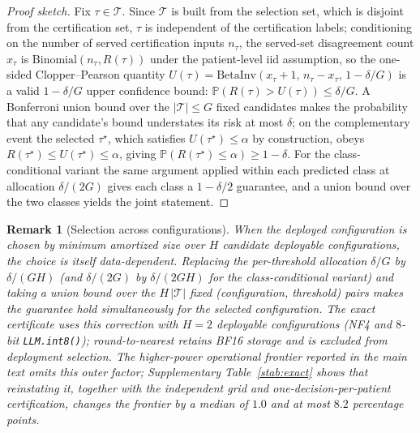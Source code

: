 \documentclass[11pt]{article}
\newtheorem*{remark}{Remark}
\theoremstyle{plain}
\newcommand{\Prob}{\mathbb{P}}
\newcommand{\Risk}{R}
\begin{document}
\begin{proof}[Proof sketch]
Fix $\tau\in\mathcal{T}$. Since $\mathcal{T}$ is built from the selection set, which is disjoint from the
certification set, $\tau$ is independent of the certification labels; conditioning on the number of
served certification inputs $n_\tau$, the served-set disagreement count $x_\tau$ is
$\mathrm{Binomial}(n_\tau,\Risk(\tau))$ under the patient-level iid assumption, so the one-sided Clopper--Pearson quantity
$U(\tau)=\mathrm{BetaInv}(x_\tau+1,\,n_\tau-x_\tau,\,1-\delta/G)$ is a valid $1-\delta/G$ upper confidence
bound: $\Prob(\Risk(\tau)>U(\tau))\le\delta/G$. A Bonferroni union bound over the $|\mathcal{T}|\le G$
fixed candidates makes the probability that any candidate's bound understates its risk at most $\delta$;
on the complementary event the selected $\tau^\star$, which satisfies $U(\tau^\star)\le\alpha$ by
construction, obeys $\Risk(\tau^\star)\le U(\tau^\star)\le\alpha$, giving
$\Prob(\Risk(\tau^\star)\le\alpha)\ge 1-\delta$. For the class-conditional variant the same argument
applied within each predicted class at allocation $\delta/(2G)$ gives each class a $1-\delta/2$ guarantee,
and a union bound over the two classes yields the joint statement.
\end{proof}

\begin{remark}[Selection across configurations]\label{rem:config}
When the deployed configuration is chosen by minimum amortized size over $H$ candidate deployable
configurations, the choice is itself data-dependent. Replacing the per-threshold allocation $\delta/G$ by
$\delta/(GH)$ (and $\delta/(2G)$ by $\delta/(2GH)$ for the class-conditional variant) and taking a union
bound over the $H\,|\mathcal{T}|$ fixed (configuration, threshold) pairs makes the guarantee hold
simultaneously for the selected configuration. The exact certificate uses this correction with $H=2$
deployable configurations (NF4 and $8$-bit \texttt{LLM.int8()}); round-to-nearest retains BF16 storage and is
excluded from deployment selection. The higher-power operational frontier reported in the main text omits
this outer factor; Supplementary Table~\ref{stab:exact} shows that reinstating it, together with the
independent grid and one-decision-per-patient certification, changes the frontier by a median of $1.0$ and
at most $8.2$ percentage points.
\end{remark}

\end{document}
